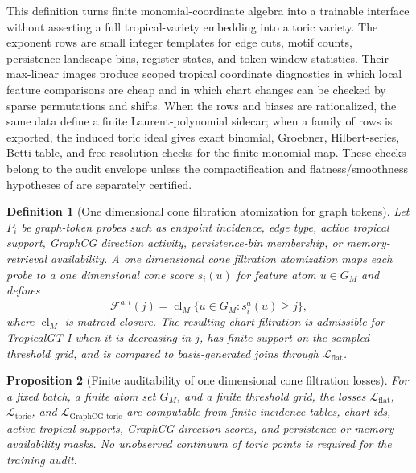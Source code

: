 \documentclass[11pt]{article}
\newtheorem{definition}{Definition}[section]
\newtheorem{proposition}[definition]{Proposition}
\begin{document}
This definition turns finite monomial-coordinate algebra into a trainable interface without asserting a full tropical-variety embedding into a toric variety.  The exponent rows are small integer templates for edge cuts, motif counts, persistence-landscape bins, register states, and token-window statistics.  Their max-linear images produce scoped tropical coordinate diagnostics in which local feature comparisons are cheap and in which chart changes can be checked by sparse permutations and shifts.  When the rows and biases are rationalized, the same data define a finite Laurent-polynomial sidecar; when a family of rows is exported, the induced toric ideal gives exact binomial, Groebner, Hilbert-series, Betti-table, and free-resolution checks for the finite monomial map.  These checks belong to the audit envelope unless the compactification and flatness/smoothness hypotheses of  are separately certified.

\begin{definition}[One dimensional cone filtration atomization for graph tokens]
\label{def:one-dimensional-cone-filtration-atomization}
Let $P_i$ be graph-token probes such as endpoint incidence, edge type, active tropical support, GraphCG direction activity, persistence-bin membership, or memory-retrieval availability.  A one dimensional cone filtration atomization maps each probe to a one dimensional cone score $s_i(u)$ for feature atom $u\in G_M$ and defines
\[
  \mathcal{F}^{a,i}(j)=\operatorname{cl}_M\{u\in G_M:s_i^a(u)\ge j\},
\]
where $\operatorname{cl}_M$ is matroid closure.  The resulting chart filtration is admissible for TropicalGT-I when it is decreasing in $j$, has finite support on the sampled threshold grid, and is compared to basis-generated joins through $\mathcal{L}_{\mathrm{flat}}$.
\end{definition}

\begin{proposition}[Finite auditability of one dimensional cone filtration losses]
\label{prop:finite-one-dimensional-cone-auditability}
For a fixed batch, a finite atom set $G_M$, and a finite threshold grid, the losses $\mathcal{L}_{\mathrm{flat}}$, $\mathcal{L}_{\mathrm{toric}}$, and $\mathcal{L}_{\mathrm{GraphCG\mbox{-}toric}}$ are computable from finite incidence tables, chart ids, active tropical supports, GraphCG direction scores, and persistence or memory availability masks.  No unobserved continuum of toric points is required for the training audit.
\end{proposition}
\end{document}
